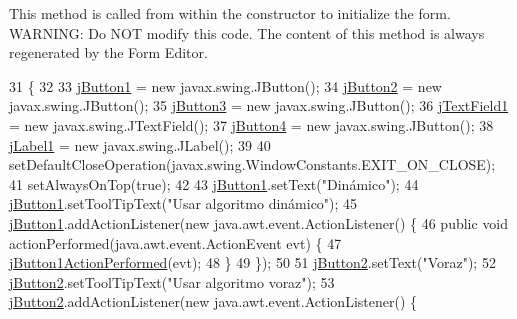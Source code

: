 This method is called from within the constructor to initialize the form. W\+A\+R\+N\+I\+NG\+: Do N\+OT modify this code. The content of this method is always regenerated by the Form Editor. 
\begin{DoxyCode}
31                                   \{
32 
33         \mbox{\hyperlink{class_interfaz_1_1_ventana_inicial_a0c01fdde6aa59c4e947850d3d89ece3a}{jButton1}} = \textcolor{keyword}{new} javax.swing.JButton();
34         \mbox{\hyperlink{class_interfaz_1_1_ventana_inicial_ac8ea3e51a862b7978b078d694528cdc5}{jButton2}} = \textcolor{keyword}{new} javax.swing.JButton();
35         \mbox{\hyperlink{class_interfaz_1_1_ventana_inicial_af37a09af6b2d616c14a3d77d835eb34d}{jButton3}} = \textcolor{keyword}{new} javax.swing.JButton();
36         \mbox{\hyperlink{class_interfaz_1_1_ventana_inicial_a45365129af4acf435140853b35aec365}{jTextField1}} = \textcolor{keyword}{new} javax.swing.JTextField();
37         \mbox{\hyperlink{class_interfaz_1_1_ventana_inicial_ad0c38a518bd73dd033484143f67a8c2b}{jButton4}} = \textcolor{keyword}{new} javax.swing.JButton();
38         \mbox{\hyperlink{class_interfaz_1_1_ventana_inicial_a9d48c0b63de7cec55a4caed1f4feb13c}{jLabel1}} = \textcolor{keyword}{new} javax.swing.JLabel();
39 
40         setDefaultCloseOperation(javax.swing.WindowConstants.EXIT\_ON\_CLOSE);
41         setAlwaysOnTop(\textcolor{keyword}{true});
42 
43         \mbox{\hyperlink{class_interfaz_1_1_ventana_inicial_a0c01fdde6aa59c4e947850d3d89ece3a}{jButton1}}.setText(\textcolor{stringliteral}{"Dinámico"});
44         \mbox{\hyperlink{class_interfaz_1_1_ventana_inicial_a0c01fdde6aa59c4e947850d3d89ece3a}{jButton1}}.setToolTipText(\textcolor{stringliteral}{"Usar algoritmo dinámico"});
45         \mbox{\hyperlink{class_interfaz_1_1_ventana_inicial_a0c01fdde6aa59c4e947850d3d89ece3a}{jButton1}}.addActionListener(\textcolor{keyword}{new} java.awt.event.ActionListener() \{
46             \textcolor{keyword}{public} \textcolor{keywordtype}{void} actionPerformed(java.awt.event.ActionEvent evt) \{
47                 \mbox{\hyperlink{class_interfaz_1_1_ventana_inicial_a224f193d5ff7aa5f8e3cd5afcda55570}{jButton1ActionPerformed}}(evt);
48             \}
49         \});
50 
51         \mbox{\hyperlink{class_interfaz_1_1_ventana_inicial_ac8ea3e51a862b7978b078d694528cdc5}{jButton2}}.setText(\textcolor{stringliteral}{"Voraz"});
52         \mbox{\hyperlink{class_interfaz_1_1_ventana_inicial_ac8ea3e51a862b7978b078d694528cdc5}{jButton2}}.setToolTipText(\textcolor{stringliteral}{"Usar algoritmo voraz"});
53         \mbox{\hyperlink{class_interfaz_1_1_ventana_inicial_ac8ea3e51a862b7978b078d694528cdc5}{jButton2}}.addActionListener(\textcolor{keyword}{new} java.awt.event.ActionListener() \{

\end{DoxyCode}
